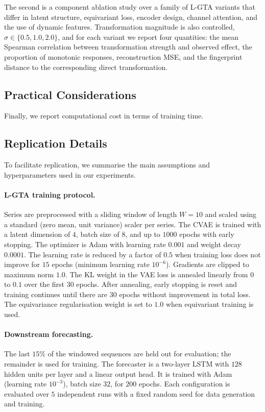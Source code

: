 The second is a component ablation study over a family of L-GTA variants that differ in latent structure, equivariant loss, encoder design, channel attention, and the use of dynamic features. Transformation magnitude is also controlled, $\sigma \in \{0.5, 1.0, 2.0\}$, and for each variant we report four quantities: the mean Spearman correlation between transformation strength and observed effect, the proportion of monotonic responses, reconstruction MSE, and the fingerprint distance to the corresponding direct transformation.

\subsection{Practical Considerations}

Finally, we report computational cost in terms of training time.

\subsection{Replication Details}
\label{subsec:replication}

To facilitate replication, we summarise the main assumptions and hyperparameters used in our experiments.

\paragraph{L-GTA training protocol.}
Series are preprocessed with a sliding window of length $W = 10$ and scaled using a standard (zero mean, unit variance) scaler per series. The CVAE is trained with a latent dimension of $4$, batch size of $8$, and up to $1000$ epochs with early stopping. The optimizer is Adam with learning rate $0.001$ and weight decay $0.0001$. The learning rate is reduced by a factor of $0.5$ when training loss does not improve for $15$ epochs (minimum learning rate $10^{-6}$). Gradients are clipped to maximum norm $1.0$. The KL weight in the VAE loss is annealed linearly from $0$ to $0.1$ over the first $30$ epochs. After annealing, early stopping is reset and training continues until there are $30$ epochs without improvement in total loss. The equivariance regularisation weight is set to $1.0$ when equivariant training is used.

\paragraph{Downstream forecasting.}
The last $15\%$ of the windowed sequences are held out for evaluation; the remainder is used for training. The forecaster is a two-layer LSTM with $128$ hidden units per layer and a linear output head. It is trained with Adam (learning rate $10^{-3}$), batch size $32$, for $200$ epochs. Each configuration is evaluated over $5$ independent runs with a fixed random seed for data generation and training. 

